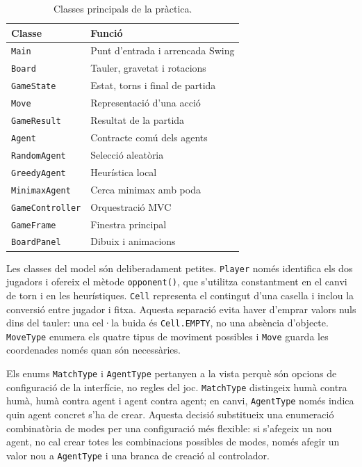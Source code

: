 \documentclass[conference,compsoc]{IEEEtran}
\begin{document}
\begin{table}[H]
\centering
\caption{Classes principals de la pràctica.}
\label{tab:classes}
\begin{tabular}{ll}
\toprule
Classe & Funció \\
\midrule
\texttt{Main} & Punt d'entrada i arrencada Swing \\
\texttt{Board} & Tauler, gravetat i rotacions \\
\texttt{GameState} & Estat, torns i final de partida \\
\texttt{Move} & Representació d'una acció \\
\texttt{GameResult} & Resultat de la partida \\
\texttt{Agent} & Contracte comú dels agents \\
\texttt{RandomAgent} & Selecció aleatòria \\
\texttt{GreedyAgent} & Heurística local \\
\texttt{MinimaxAgent} & Cerca minimax amb poda \\
\texttt{GameController} & Orquestració MVC \\
\texttt{GameFrame} & Finestra principal \\
\texttt{BoardPanel} & Dibuix i animacions \\
\bottomrule
\end{tabular}
\end{table}

Les classes del model són deliberadament petites. \texttt{Player} només identifica
els dos jugadors i ofereix el mètode \texttt{opponent()}, que s'utilitza
constantment en el canvi de torn i en les heurístiques. \texttt{Cell} representa
el contingut d'una casella i inclou la conversió entre jugador i fitxa. Aquesta
separació evita haver d'emprar valors nuls dins del tauler: una cel·la buida és
\texttt{Cell.EMPTY}, no una absència d'objecte. \texttt{MoveType} enumera els
quatre tipus de moviment possibles i \texttt{Move} guarda les coordenades només
quan són necessàries.

Els enums \texttt{MatchType} i \texttt{AgentType} pertanyen a la vista perquè són
opcions de configuració de la interfície, no regles del joc. \texttt{MatchType}
distingeix humà contra humà, humà contra agent i agent contra agent; en canvi,
\texttt{AgentType} només indica quin agent concret s'ha de crear. Aquesta decisió
substitueix una enumeració combinatòria de modes per una configuració més
flexible: si s'afegeix un nou agent, no cal crear totes les combinacions possibles
de modes, només afegir un valor nou a \texttt{AgentType} i una branca de creació al
controlador.
\end{document}
